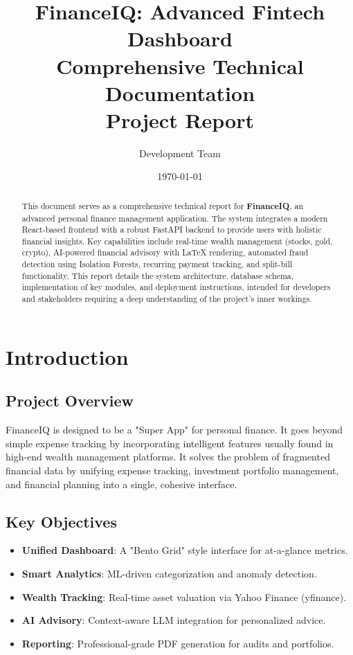 \documentclass[12pt, a4paper]{report}
\title{
    \vspace*{2cm}
    \textbf{\Huge FinanceIQ: Advanced Fintech Dashboard} \\
    \vspace{0.5cm}
    \Large Comprehensive Technical Documentation \\
    \vspace{2cm}
    \textbf{Project Report}
}
\author{Development Team}
\date{\today}
\begin{document}
\maketitle

\begin{abstract}
This document serves as a comprehensive technical report for \textbf{FinanceIQ}, an advanced personal finance management application. The system integrates a modern React-based frontend with a robust FastAPI backend to provide users with holistic financial insights. Key capabilities include real-time wealth management (stocks, gold, crypto), AI-powered financial advisory with LaTeX rendering, automated fraud detection using Isolation Forests, recurring payment tracking, and split-bill functionality. This report details the system architecture, database schema, implementation of key modules, and deployment instructions, intended for developers and stakeholders requiring a deep understanding of the project's inner workings.
\end{abstract}

\tableofcontents
\newpage

\chapter{Introduction}
\section{Project Overview}
FinanceIQ is designed to be a "Super App" for personal finance. It goes beyond simple expense tracking by incorporating intelligent features usually found in high-end wealth management platforms. It solves the problem of fragmented financial data by unifying expense tracking, investment portfolio management, and financial planning into a single, cohesive interface.

\section{Key Objectives}
\begin{itemize}
    \item \textbf{Unified Dashboard}: A "Bento Grid" style interface for at-a-glance metrics.
    \item \textbf{Smart Analytics}: ML-driven categorization and anomaly detection.
    \item \textbf{Wealth Tracking}: Real-time asset valuation via Yahoo Finance (yfinance).
    \item \textbf{AI Advisory}: Context-aware LLM integration for personalized advice.
    \item \textbf{Reporting}: Professional-grade PDF generation for audits and portfolios.
\end{itemize}
\end{document}
